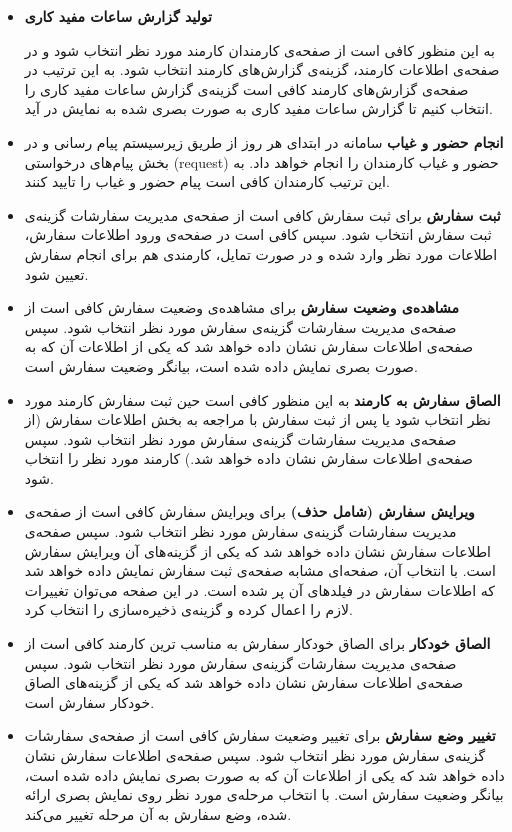 \begin{itemize}
\item \textbf{تولید گزارش ساعات مفید کاری} \newline

به این منظور کافی است از صفحه‌ی کارمندان کارمند مورد نظر انتخاب شود و در صفحه‌ی اطلاعات کارمند، گزینه‌ی  گزارش‌های کارمند انتخاب شود. به این ترتیب در صفحه‌ی گزارش‌های کارمند کافی است گزینه‌ی گزارش ساعات مفید کاری را انتخاب کنیم تا گزارش ساعات مفید کاری به صورت بصری شده به نمایش در آید.

\item \textbf{انجام حضور و غیاب} \newline
سامانه در ابتدای هر روز از طریق زیرسیستم پیام رسانی و در بخش پیام‌های درخواستی (request) حضور و غیاب کارمندان را انجام خواهد داد. به این ترتیب کارمندان کافی است پیام حضور و غیاب را تایید کنند.
\item \textbf{ثبت سفارش} \newline
برای ثبت سفارش کافی است از صفحه‌ی مدیریت سفارشات گزینه‌ی ثبت سفارش انتخاب شود. سپس کافی است در صفحه‌ی ورود اطلاعات سفارش، اطلاعات مورد نظر وارد شده و در صورت تمایل، کارمندی هم برای انجام سفارش تعیین شود.
\item \textbf{مشاهده‌ی وضعیت سفارش} \newline
برای مشاهده‌ی  وضعیت سفارش کافی است از صفحه‌ی مدیریت سفارشات گزینه‌ی سفارش مورد نظر انتخاب شود. سپس صفحه‌ی اطلاعات سفارش نشان داده خواهد شد که یکی از اطلاعات آن که به صورت بصری نمایش داده شده است، بیانگر وضعیت سفارش است.

\item \textbf{الصاق سفارش به کارمند} \newline
به این منظور کافی است حین ثبت سفارش کارمند مورد نظر انتخاب شود یا پس از ثبت سفارش با  مراجعه به بخش اطلاعات سفارش (از صفحه‌ی مدیریت سفارشات گزینه‌ی سفارش مورد نظر انتخاب شود. سپس صفحه‌ی اطلاعات سفارش نشان داده خواهد شد.)
کارمند مورد نظر را انتخاب شود.
\item \textbf{ویرایش سفارش (شامل حذف)} \newline
برای ویرایش سفارش  کافی است از صفحه‌ی مدیریت سفارشات گزینه‌ی سفارش مورد نظر انتخاب شود. سپس صفحه‌ی اطلاعات سفارش نشان داده خواهد شد که یکی از گزینه‌های آن ویرایش سفارش است. با انتخاب آن، صفحه‌ای مشابه صفحه‌ی ثبت سفارش نمایش داده خواهد شد که اطلاعات سفارش در فیلد‌های آن پر شده است. در این صفحه می‌توان تغییرات لازم را اعمال کرده و گزینه‌ی ذخیره‌سازی را انتخاب کرد.

\item \textbf{الصاق خودکار} \newline
برای الصاق خودکار سفارش به مناسب ترین کارمند کافی است از صفحه‌ی مدیریت سفارشات گزینه‌ی سفارش مورد نظر انتخاب شود. سپس صفحه‌ی اطلاعات سفارش نشان داده خواهد شد که یکی از گزینه‌های الصاق خودکار سفارش است.
\item \textbf{تغییر وضع سفارش} \newline
برای تغییر  وضعیت سفارش کافی است از صفحه‌ی سفارشات گزینه‌ی سفارش مورد نظر انتخاب شود. سپس صفحه‌ی اطلاعات سفارش نشان داده خواهد شد که یکی از اطلاعات آن که به صورت بصری نمایش داده شده است، بیانگر وضعیت سفارش است.
با انتخاب مرحله‌ی مورد نظر روی نمایش بصری ارائه شده، وضع سفارش به آن مرحله تغییر می‌کند.


\end{itemize}

